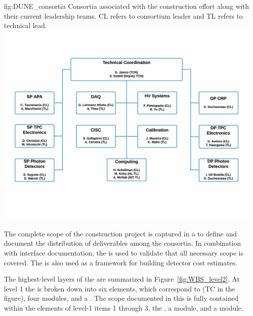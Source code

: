 \begin{dunefigure}{fig:DUNE_consortia}
  {Consortia associated with the  construction effort along with their 
current leadership teams. CL refers to consortium leader
    and TL refers to technical lead.}
  \includegraphics[width=0.99\textwidth]{graphics/Consortia_Org_Chart}
\end{dunefigure}

The complete scope of the  construction project is captured in a 
 to define and document the distribution of deliverables among 
the consortia.  In combination with interface documentation, the 
 is used to validate that all necessary scope is covered.  The 
 is also used as a framework for building  
detector cost estimates.

The highest-level layers of the   are summarized 
in Figure~\ref{fig:WBS_level2}.  At level 1 the  is broken down into 
six elements, which correspond to  (TC in the figure), %
four 
 modules, and a .  The scope documented %
in this  is fully contained within the elements of level-1 items 1 through 3, the , a   module, and a   module.

